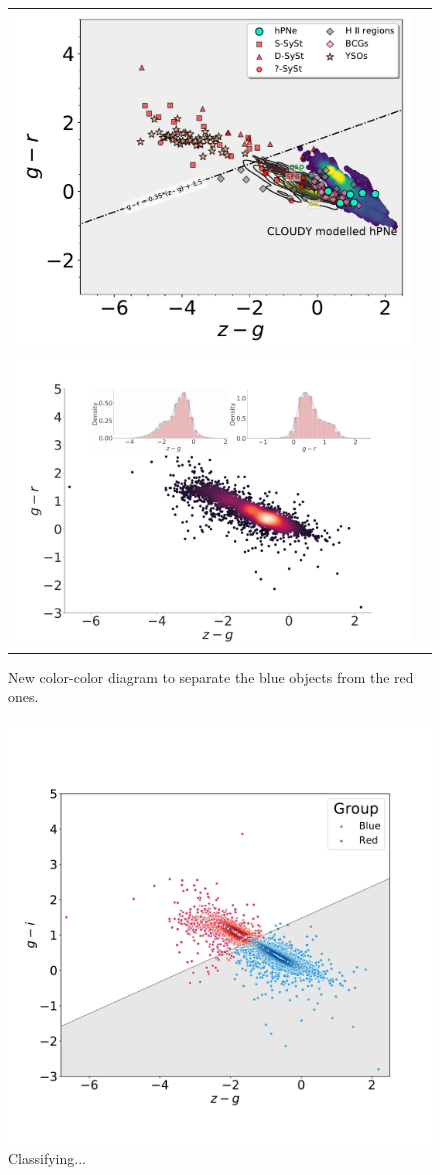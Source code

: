\documentclass[fleqn,usenatbib]{mnras}
\begin{document}
\begin{figure}
\centering
\begin{tabular}{l l}
  \includegraphics[width=0.5\linewidth, trim=10 10 5 8, clip]{Figs/Fig-SPLUS-gr-zg.pdf}
   \includegraphics[width=0.6\linewidth, trim=10 10 5 8. clip]{Figs/red-blue-colorObjects-gr-edit.jpg}
  \end{tabular}  
  \caption{New color-color diagram to separate the blue objects from the red ones.}
\label{fig:new-color}
\end{figure}

\begin{figure}
	\includegraphics[width=0.9\linewidth]{Figs/blued-red-hierarchical.pdf}
    \caption{Classifying...}
    \label{fig:cluster}
\end{figure}
\end{document}
